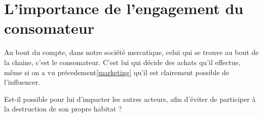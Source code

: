 \section{L'importance de l'engagement du consomateur}

\smallbreak Au bout du compte, dans notre société mercatique, celui qui se trouve au bout de la chaine, c'est le consomateur.
C'est lui qui décide des achats qu'il effectue, même si on a vu précedement\ref{marketing} qu'il est clairement possible de l'influencer.

Est-il possible pour lui d'impacter les autres acteurs, afin d'éviter de participer à la destruction de son propre habitat ?